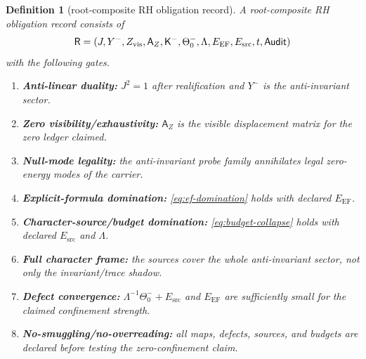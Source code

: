 \documentclass[11pt]{article}
\newtheorem{definition}{Definition}
\newcommand{\K}{\mathsf K}
\newcommand{\A}{\mathsf A}
\newcommand{\EF}{\mathrm{EF}}
\newcommand{\src}{\mathrm{src}}
\begin{document}
\begin{definition}[root-composite RH obligation record]
A root-composite RH obligation record consists of
\[
\mathsf R=(J,Y^-,Z_{\rm vis},\A_Z,\K^-,\Theta_0^-,\Lambda,E_{\EF},E_{\src},t,\mathsf{Audit})
\]
with the following gates.
\begin{enumerate}[label=G\arabic*.,leftmargin=3em]
  \item \textbf{Anti-linear duality:} $J^2=1$ after realification and $Y^-$ is the anti-invariant sector.
  \item \textbf{Zero visibility/exhaustivity:} $\A_Z$ is the visible displacement matrix for the zero ledger claimed.
  \item \textbf{Null-mode legality:} the anti-invariant probe family annihilates legal zero-energy modes of the carrier.
  \item \textbf{Explicit-formula domination:} \eqref{eq:ef-domination} holds with declared $E_{\EF}$.
  \item \textbf{Character-source/budget domination:} \eqref{eq:budget-collapse} holds with declared $E_{\src}$ and $\Lambda$.
  \item \textbf{Full character frame:} the sources cover the whole anti-invariant sector, not only the invariant/trace shadow.
  \item \textbf{Defect convergence:} $\Lambda^{-1}\Theta_0^-+E_{\src}$ and $E_{\EF}$ are sufficiently small for the claimed confinement strength.
  \item \textbf{No-smuggling/no-overreading:} all maps, defects, sources, and budgets are declared before testing the zero-confinement claim.
\end{enumerate}
\end{definition}
\end{document}
